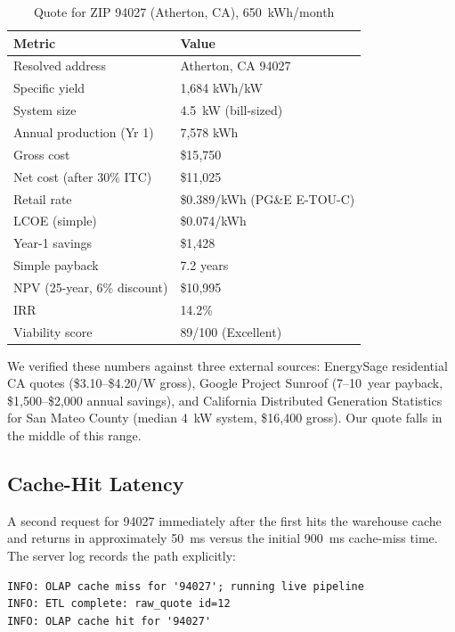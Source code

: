 \documentclass[10pt, conference]{IEEEtran}
\begin{document}
\begin{table}[H]
\centering
\caption{Quote for ZIP 94027 (Atherton, CA), 650~kWh/month}
\label{tab:atherton}
\small
\begin{tabular}{ll}
\toprule
\textbf{Metric} & \textbf{Value} \\
\midrule
Resolved address & Atherton, CA 94027 \\
Specific yield & 1{,}684 kWh/kW \\
System size & 4.5~kW (bill-sized) \\
Annual production (Yr 1) & 7{,}578 kWh \\
Gross cost & \$15{,}750 \\
Net cost (after 30\% ITC) & \$11{,}025 \\
Retail rate & \$0.389/kWh (PG\&E E-TOU-C) \\
LCOE (simple) & \$0.074/kWh \\
Year-1 savings & \$1{,}428 \\
Simple payback & 7.2 years \\
NPV (25-year, 6\% discount) & \$10{,}995 \\
IRR & 14.2\% \\
Viability score & 89/100 (Excellent) \\
\bottomrule
\end{tabular}
\end{table}

We verified these numbers against three external sources: EnergySage residential CA quotes (\$3.10--\$4.20/W gross), Google Project Sunroof (7--10~year payback, \$1{,}500--\$2{,}000 annual savings), and California Distributed Generation Statistics for San Mateo County (median 4~kW system, \$16{,}400 gross). Our quote falls in the middle of this range.

\subsection{Cache-Hit Latency}

A second request for 94027 immediately after the first hits the warehouse cache and returns in approximately 50~ms versus the initial 900~ms cache-miss time. The server log records the path explicitly:

\begin{lstlisting}[basicstyle=\ttfamily\scriptsize]
INFO: OLAP cache miss for '94027'; running live pipeline
INFO: ETL complete: raw_quote id=12
INFO: OLAP cache hit for '94027'
\end{lstlisting}
\end{document}

